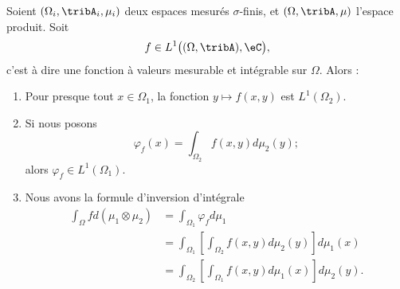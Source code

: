 \begin{theorem}\label{ThoFubinioYLtPI}
    Soient \( (\Omega_i,\tribA_i,\mu_i)\) deux espaces mesurés \( \sigma\)-finis, et \( (\Omega,\tribA,\mu)\) l'espace produit. Soit 
    \begin{equation}
        f\in L^1\big( (\Omega,\tribA),\eC \big),
    \end{equation}
    c'est à dire une fonction à valeurs mesurable et intégrable sur \( \Omega\). Alors :
    \begin{enumerate}
        \item       \label{ITEMooVFGWooZTePQS}
            Pour presque tout \( x\in \Omega_1\), la fonction \( y\mapsto f(x,y)\) est \( L^1(\Omega_2)\).
        \item       \label{ITEMooCYMKooUdizni}
            Si nous posons
            \begin{equation}
                \varphi_f(x)=\int_{\Omega_2}f(x,y)d\mu_2(y);
            \end{equation}
            alors \( \varphi_f\in L^1(\Omega_1)\).
        \item   \label{ItemQMWiolgiii}
            Nous avons la formule d'inversion d'intégrale
            \begin{subequations}
                \begin{align}
                \int_{\Omega}fd(\mu_1\otimes \mu_2)&=\int_{\Omega_1}\varphi_fd\mu_1\\
                &=\int_{\Omega_1}\left[ \int_{\Omega_2}f(x,y)d\mu_2(y) \right]d\mu_1(x)\\
                &=\int_{\Omega_2}\left[ \int_{\Omega_1}f(x,y)d\mu_1(x) \right]d\mu_2(y).
                \end{align}
            \end{subequations}
    \end{enumerate}

\end{theorem}

